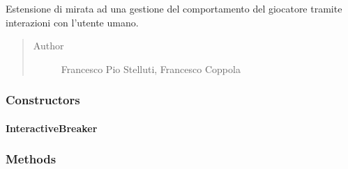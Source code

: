 \documentclass[letterpaper,10pt,italian,openany,oneside]{sphinxmanual}
\begin{document}
\begin{fulllineitems}
\label{\detokenize{source/it/unicam/cs/pa/mastermind/players/InteractiveBreaker:it.unicam.cs.pa.mastermind.players.InteractiveBreaker}}
Estensione di  mirata ad una gestione del comportamento del giocatore tramite interazioni con l’utente umano.
\begin{quote}\begin{description}
\item[{Author}] \leavevmode
Francesco Pio Stelluti, Francesco Coppola

\end{description}\end{quote}

\end{fulllineitems}



\subsubsection{Constructors}
\label{\detokenize{source/it/unicam/cs/pa/mastermind/players/InteractiveBreaker:constructors}}

\paragraph{InteractiveBreaker}
\label{\detokenize{source/it/unicam/cs/pa/mastermind/players/InteractiveBreaker:id1}}

\begin{fulllineitems}
\label{\detokenize{source/it/unicam/cs/pa/mastermind/players/InteractiveBreaker:it.unicam.cs.pa.mastermind.players.InteractiveBreaker.InteractiveBreaker()}}
\end{fulllineitems}



\subsubsection{Methods}
\label{\detokenize{source/it/unicam/cs/pa/mastermind/players/InteractiveBreaker:methods}}
\end{document}
